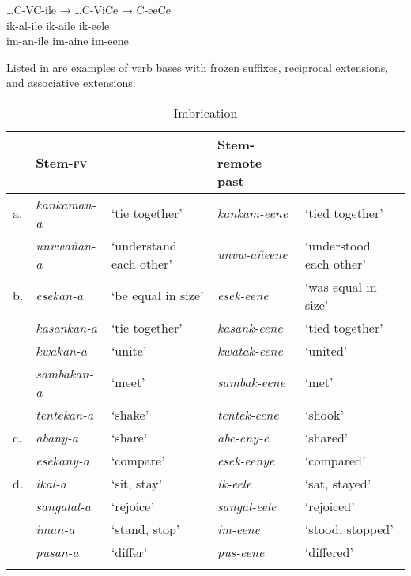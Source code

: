 \documentclass[output=paper]{langsci/langscibook}
\begin{document}
\ea
\label{ex:5.kawasha}
 \glll …C-VC-ile  →  …C-ViCe  →  C-eeCe  \\
  ik-al-ile {}   ik-aile  {}  ik-eele\\
 im-an-ile  {}  im-aine  {}  im-eene\\

\z

Listed in  are examples of verb bases with frozen suffixes, reciprocal extensions, and associative extensions.


\begin{table}
\begin{tabularx}{\textwidth}{llp{25.5mm}lQ}
\lsptoprule
 & Stem-\textsc{fv} &  & Stem-remote past & \\
\midrule
a. & \textit{kankaman-a} & `tie together' & \textit{kankam-eene} & `tied together' \\
 & \textit{unvwañan-a} & `understand each other' & \textit{unvw-añeene} & `understood each other' \\
\tablevspace
b. & \textit{esekan-a} & `be equal in size' & \textit{esek-eene} & `was equal in size' \\
 & \textit{kasankan-a} & `tie together' & \textit{kasank-eene} & `tied together' \\
 & \textit{kwakan-a} & `unite' & \textit{kwatak-eene} & `united' \\
 & \textit{sambakan-a} & `meet' & \textit{sambak-eene} & `met' \\
 & \textit{tentekan-a} & `shake' & \textit{tentek-eene} & `shook' \\
\tablevspace
c. & \textit{abany-a} & `share' & \textit{abe-eny-e} & `shared' \\
 & \textit{esekany-a} & `compare' & \textit{esek-eenye} & `compared' \\
\tablevspace
d. & \textit{ikal-a} & `sit, stay' & \textit{ik-eele} & `sat, stayed' \\
 & \textit{sangalal-a} & `rejoice' & \textit{sangal-eele} & `rejoiced' \\
 & \textit{iman-a} & `stand, stop' & \textit{im-eene} & `stood, stopped' \\
 & \textit{pusan-a} & `differ' & \textit{pus-eene} & `differed' \\

\lspbottomrule
\end{tabularx}

\caption{Imbrication}
\label{tab:20.kawasha}

\end{table}
\end{document}
